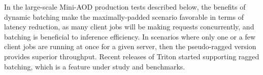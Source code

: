 In the large-scale Mini-AOD production tests described below, the benefits of dynamic batching make the maximally-padded scenario favorable in terms of latency reduction, as many client jobs will be making requests concurrently, and batching is beneficial to inference efficiency. In scenarios where only one or a few client jobs are running at once for a given server, then the pseudo-ragged version provides superior throughput. Recent releases of Triton started supporting ragged batching, which is a feature under study and benchmarks.%